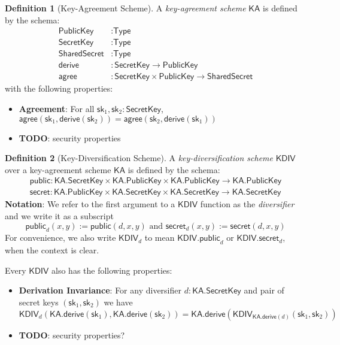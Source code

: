 \documentclass[a4paper]{article}
\newcommand{\TODO}[1]{{\color{red}\textbf{TODO}}: #1}
\theoremstyle{definition}
\newtheorem{definition}{Definition}[subsection]
\newcommand{\KA}{{\textsf{KA}}}
\newcommand{\KDIV}{{\textsf{KDIV}}}
\newcommand{\PublicKey}{{\textsf{PublicKey}}}
\newcommand{\SecretKey}{{\textsf{SecretKey}}}
\newcommand{\SharedSecret}{{\textsf{SharedSecret}}}
\newcommand{\Type}{{\textsf{Type}}}
\newcommand{\agree}{{\textsf{agree}}}
\newcommand{\derive}{{\textsf{derive}}}
\newcommand{\public}{{\textsf{public}}}
\newcommand{\secret}{{\textsf{secret}}}
\newcommand{\sk}{{\textsf{sk}}}
\begin{document}
\begin{definition}[Key-Agreement Scheme]
    A \emph{key-agreement scheme} $\KA$ is defined by the schema:
    \begin{align*}
        \PublicKey    &: \Type \\
        \SecretKey    &: \Type \\
        \SharedSecret &: \Type \\
        \derive       &: \SecretKey \to \PublicKey \\
        \agree        &: \SecretKey \times \PublicKey \to \SharedSecret
    \end{align*}
    with the following properties:
    \begin{itemize}
        \item \textbf{Agreement}: For all $\sk_1, \sk_2 : \SecretKey$, $\agree(\sk_1, \derive(\sk_2)) = \agree(\sk_2, \derive(\sk_1))$
        \item \TODO{security properties}
    \end{itemize}
\end{definition}

\begin{definition}[Key-Diversification Scheme]
    A \emph{key-diversification scheme} $\KDIV$ over a key-agreement scheme $\KA$ is defined by the schema:
    \begin{align*}
        \public : \KA.\SecretKey \times \KA.\PublicKey \times \KA.\PublicKey \to \KA.\PublicKey \\
        \secret : \KA.\PublicKey \times \KA.\SecretKey \times \KA.\SecretKey \to \KA.\SecretKey
    \end{align*}
    \textbf{Notation}: We refer to the first argument to a $\KDIV$ function as the \emph{diversifier} and we write it as a subscript
    \[\public_d(x, y) := \public(d, x, y) \,\,\text{and}\,\, \secret_d(x, y) := \secret(d, x, y)\]
    For convenience, we also write $\KDIV_d$ to mean $\KDIV.\public_d$ or $\KDIV.\secret_d$, when the context is clear.
    
    Every $\KDIV$ also has the following properties:
    \begin{itemize}
        \item \textbf{Derivation Invariance}: For any diversifier $d : \KA.\SecretKey$ and pair of secret keys $(\sk_1, \sk_2)$ we have
            \[\KDIV_d(\KA.\derive(\sk_1), \KA.\derive(\sk_2)) = \KA.\derive(\KDIV_{\KA.\derive(d)}(\sk_1, \sk_2))\]
        \item \TODO{security properties?}
    \end{itemize}
\end{definition}
\end{document}
